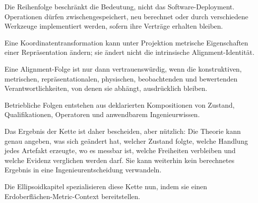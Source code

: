 Die Reihenfolge beschränkt die Bedeutung, nicht das Software-Deployment.
Operationen dürfen zwischengespeichert, neu berechnet oder durch verschiedene
Werkzeuge implementiert werden, sofern ihre Verträge erhalten bleiben.

\begin{proposition}
\label{prop:alignment-not-crs-invariant}
Eine Koordinatentransformation kann unter Projektion metrische Eigenschaften
einer Repräsentation ändern; sie ändert nicht die intrinsische
Alignment-Identität.
\end{proposition}

\begin{proposition}
\label{prop:alignment-multi-layer-system}
Eine Alignment-Folge ist nur dann vertrauenswürdig, wenn die konstruktiven,
metrischen, repräsentationalen, physischen, beobachtenden und bewertenden
Verantwortlichkeiten, von denen sie abhängt, ausdrücklich bleiben.
\end{proposition}

\begin{proposition}
\label{prop:operational-behaviour-emerges}
Betriebliche Folgen entstehen aus deklarierten Kompositionen von Zustand,
Qualifikationen, Operatoren und anwendbarem Ingenieurwissen.
\end{proposition}

Das Ergebnis der Kette ist daher bescheiden, aber nützlich: Die Theorie kann
genau angeben, was sich geändert hat, welcher Zustand folgte, welche Handlung
jedes Artefakt erzeugte, wo es messbar ist, welche Freiheiten verbleiben und
welche Evidenz verglichen werden darf. Sie kann weiterhin kein berechnetes
Ergebnis in eine Ingenieurentscheidung verwandeln.

Die Ellipsoidkapitel spezialisieren diese Kette nun, indem sie einen
Erdoberflächen-Metric-Context bereitstellen.
